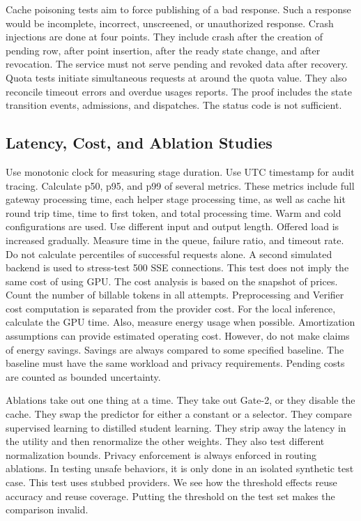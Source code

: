 \documentclass{FastFyp}
\begin{document}
Cache poisoning tests aim to force publishing of a bad response.
Such a response would be incomplete, incorrect, unscreened, or unauthorized response.
Crash injections are done at four points.
They include crash after the creation of pending row, after point insertion, after the ready state change, and after revocation.
The service must not serve pending and revoked data after recovery.
Quota tests initiate simultaneous requests at around the quota value.
They also reconcile timeout errors and overdue usages reports.
The proof includes the state transition events, admissions, and dispatches.
The status code is not sufficient.

\subsection{Latency, Cost, and Ablation Studies}
Use monotonic clock for measuring stage duration.
Use UTC timestamp for audit tracing.
Calculate p50, p95, and p99 of several metrics.
These metrics include full gateway processing time, each helper stage processing time,
as well as cache hit round trip time, time to first token, and total processing time.
Warm and cold configurations are used.
Use different input and output length.
Offered load is increased gradually.
Measure time in the queue, failure ratio, and timeout rate.
Do not calculate percentiles of successful requests alone.
A second simulated backend is used to stress-test 500 SSE connections.
This test does not imply the same cost of using GPU.
The cost analysis is based on the snapshot of prices.
Count the number of billable tokens in all attempts.
Preprocessing and Verifier cost computation is separated from the provider cost.
For the local inference, calculate the GPU time.
Also, measure energy usage when possible.
Amortization assumptions can provide estimated operating cost.
However, do not make claims of energy savings.
Savings are always compared to some specified baseline.
The baseline must have the same workload and privacy requirements.
Pending costs are counted as bounded uncertainty.

Ablations take out one thing at a time.
They take out Gate-2, or they disable the cache.
They swap the predictor for either a constant or a selector.
They compare supervised learning to distilled student learning.
They strip away the latency in the utility and then renormalize the other weights.
They also test different normalization bounds.
Privacy enforcement is always enforced in routing ablations.
In testing unsafe behaviors, it is only done in an isolated synthetic test case.
This test uses stubbed providers.
We see how the threshold effects reuse accuracy and reuse coverage.
Putting the threshold on the test set makes the comparison invalid.
\end{document}
